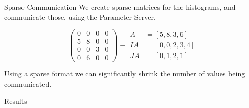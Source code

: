 \documentclass[final]{beamer}
\newlength{\onecolwid}
\begin{document}
\begin{frame}[t]
\begin{columns}[t]
\begin{column}{\onecolwid}
\begin{block}{Sparse Communication}
		We create sparse matrices for the histograms, and communicate
		those, using the Parameter Server.
		
		\begin{equation*}
			\begin{pmatrix}
			0 & 0 & 0 & 0 \\
			5 & 8 & 0 & 0 \\
			0 & 0 & 3 & 0 \\
			0 & 6 & 0 & 0
			\end{pmatrix} \equiv 
			\begin{aligned}
			A &= [5, 8, 3, 6] \\
			IA &= [0, 0, 2, 3, 4] \\
			JA &= [0, 1, 2, 1]
			\end{aligned}
		\end{equation*}
		
		Using a sparse format we can significantly shrink the number of values being communicated.
	
	\end{block}
	
	\begin{block}{Results}


\end{block}
\end{column}
\end{columns}
\end{frame}
\end{document}
